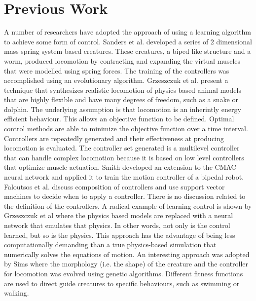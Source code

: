 \section{Previous Work}
A number of researchers have adopted the approach of using a learning algorithm
to achieve some form of control. Sanders et al. \cite{SandersLobbRiddle}
developed a series of 2 dimensional mass spring system based creatures. These
creatures, a biped like structure and a worm, produced locomotion by
contracting and expanding the virtual muscles that were modelled using spring
forces. The training of the controllers was accomplished using an evolutionary
algorithm.  Grzeszczuk et al. \cite{GrzeszczukTerzopoulos} present a technique
that synthesizes realistic locomotion of physics based animal models that are
highly flexible and have many degrees of freedom, such as a snake or dolphin.
The underlying assumption is that locomotion is an inherintly energy efficient
behaviour. This allows an objective function to be defined.  Optimal control
methods are able to minimize the objective function over a time interval.
Controllers are repeatedly generated and their effectiveness at producing
locomotion is evaluated. The controller set generated is a multilevel
controller that can handle complex locomotion because it is based on low level
controllers that optimize muscle actuation. Smith \cite{RusselSmith} developed
an extension to the CMAC neural network and applied it to train the motion
controller of a bipedal robot. Faloutsos et al. \cite{FaloutsosvandePanneTerzopolous} 
discuss composition of controllers and use support vector machines to
decide when to apply a controller. There is no discussion related to the
definition of the controllers. A radical example of learning control is shown
by Grzeszczuk et al \cite{GrzeszczukTerzopoulosHinton} where the physics based
models are replaced with a neural network that emulates that physics. In other
words, not only is the control learned, but so is the physics.  This approach
has the advantage of being less computationally demanding than a true
physics-based simulation that numerically solves the equations of motion. An
interesting approach was adopted by Sims \cite{Sims} where the morphology (i.e.
the shape) of the creature and the controller for locomotion was evolved
using genetic algorithms. Different fitness functions are used to direct guide
creatures to specific behaviours, such as swimming or walking.

